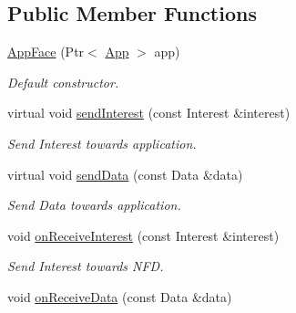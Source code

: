 \subsection*{Public Member Functions}
\begin{DoxyCompactItemize}
\item 
\hyperlink{classns3_1_1ndn_1_1AppFace_ae0cc5ee1d9f879502aff95261f6fd153}{App\+Face} (Ptr$<$ \hyperlink{classns3_1_1ndn_1_1App}{App} $>$ app)\hypertarget{classns3_1_1ndn_1_1AppFace_ae0cc5ee1d9f879502aff95261f6fd153}{}\label{classns3_1_1ndn_1_1AppFace_ae0cc5ee1d9f879502aff95261f6fd153}

\begin{DoxyCompactList}\small\item\em Default constructor. \end{DoxyCompactList}\item 
virtual void \hyperlink{classns3_1_1ndn_1_1AppFace_a3801ac0d41bd043cc08583bf34cada62}{send\+Interest} (const Interest \&interest)\hypertarget{classns3_1_1ndn_1_1AppFace_a3801ac0d41bd043cc08583bf34cada62}{}\label{classns3_1_1ndn_1_1AppFace_a3801ac0d41bd043cc08583bf34cada62}

\begin{DoxyCompactList}\small\item\em Send Interest towards application. \end{DoxyCompactList}\item 
virtual void \hyperlink{classns3_1_1ndn_1_1AppFace_a4eedd22fbd70223640ed4ec2fed2864f}{send\+Data} (const Data \&data)\hypertarget{classns3_1_1ndn_1_1AppFace_a4eedd22fbd70223640ed4ec2fed2864f}{}\label{classns3_1_1ndn_1_1AppFace_a4eedd22fbd70223640ed4ec2fed2864f}

\begin{DoxyCompactList}\small\item\em Send Data towards application. \end{DoxyCompactList}\item 
void \hyperlink{classns3_1_1ndn_1_1AppFace_ab4992fae4a94817bb0cff46009a2b37b}{on\+Receive\+Interest} (const Interest \&interest)\hypertarget{classns3_1_1ndn_1_1AppFace_ab4992fae4a94817bb0cff46009a2b37b}{}\label{classns3_1_1ndn_1_1AppFace_ab4992fae4a94817bb0cff46009a2b37b}

\begin{DoxyCompactList}\small\item\em Send Interest towards N\+FD. \end{DoxyCompactList}\item 
void \hyperlink{classns3_1_1ndn_1_1AppFace_ad767c3fdb47be05d3eb9061dac1bcc2f}{on\+Receive\+Data} (const Data \&data)\hypertarget{classns3_1_1ndn_1_1AppFace_ad767c3fdb47be05d3eb9061dac1bcc2f}{}\label{classns3_1_1ndn_1_1AppFace_ad767c3fdb47be05d3eb9061dac1bcc2f}


\end{DoxyCompactItemize}
